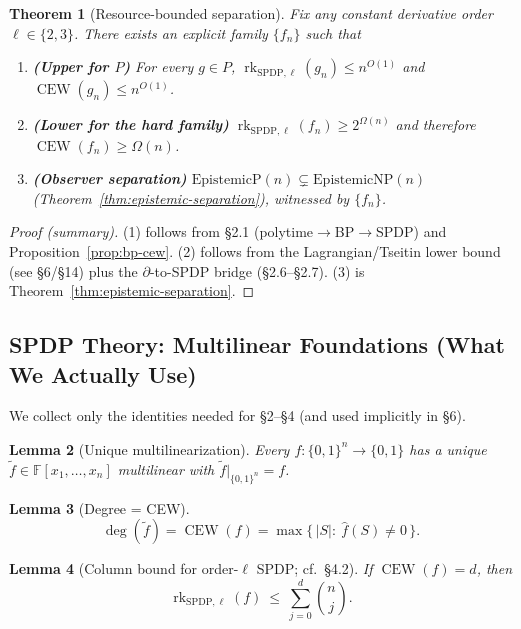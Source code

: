 \documentclass[12pt]{article}
\newtheorem{theorem}{Theorem}
\newtheorem{lemma}[theorem]{Lemma}
\theoremstyle{definition}
\theoremstyle{definition}
\theoremstyle{remark}
\theoremstyle{remark}
\begin{document}
\begin{theorem}[Resource-bounded separation]\label{thm:resource-bounded-sep}
Fix any constant derivative order $\ell\in\{2,3\}$. There exists an explicit family $\{f_n\}$ such that

\begin{enumerate}
\item \textbf{(Upper for $P$)} For every $g\in P$, $\operatorname{rk}_{\mathrm{SPDP},\ell}(g_n)\le n^{O(1)}$ and $\operatorname{CEW}(g_n)\le n^{O(1)}$.

\item \textbf{(Lower for the hard family)} $\operatorname{rk}_{\mathrm{SPDP},\ell}(f_n)\ge 2^{\Omega(n)}$ and therefore $\operatorname{CEW}(f_n)\ge\Omega(n)$.

\item \textbf{(Observer separation)} $\mathrm{EpistemicP}(n)\subsetneq\mathrm{EpistemicNP}(n)$ (Theorem~\ref{thm:epistemic-separation}), witnessed by $\{f_n\}$.
\end{enumerate}
\end{theorem}

\begin{proof}[Proof (summary)]
(1) follows from \S2.1 (polytime$\to$BP$\to$SPDP) and Proposition~\ref{prop:bp-cew}.
(2) follows from the Lagrangian/Tseitin lower bound (see \S6/\S14) plus the $\partial$-to-SPDP bridge (\S2.6--\S2.7).
(3) is Theorem~\ref{thm:epistemic-separation}.
\end{proof}

\subsection{SPDP Theory: Multilinear Foundations (What We Actually Use)}

We collect only the identities needed for \S2--\S4 (and used implicitly in \S6).

\begin{lemma}[Unique multilinearization]\label{lem:unique-multilin}
Every $f:\{0,1\}^n\to\{0,1\}$ has a unique $\tilde f\in\mathbb{F}[x_1,\dots,x_n]$ multilinear with $\tilde f|_{\{0,1\}^n}=f$.
\end{lemma}

\begin{lemma}[Degree = CEW]\label{lem:degree-cew}
\[
\deg(\tilde f) = \operatorname{CEW}(f) = \max\{\,|S|:\ \hat f(S)\neq 0\,\}.
\]
\end{lemma}

\begin{lemma}[Column bound for order-$\ell$ SPDP; cf.\ \S4.2]\label{lem:column-bound}
If $\operatorname{CEW}(f)=d$, then
\[
\operatorname{rk}_{\mathrm{SPDP},\ell}(f) \ \le\ \sum_{j=0}^d \binom{n}{j}.
\]
\end{lemma}
\end{document}
